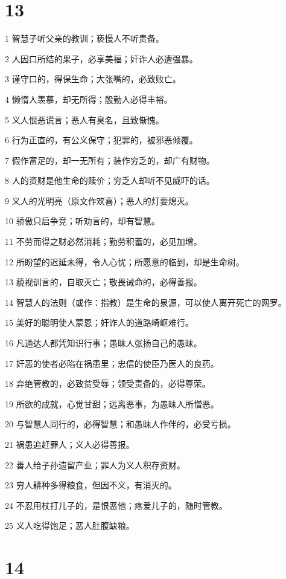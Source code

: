 \chapter{13}

\par 1 智慧子听父亲的教训；亵慢人不听责备。
\par 2 人因口所结的果子，必享美福；奸诈人必遭强暴。
\par 3 谨守口的，得保生命；大张嘴的，必致败亡。
\par 4 懒惰人羡慕，却无所得；殷勤人必得丰裕。
\par 5 义人恨恶谎言；恶人有臭名，且致惭愧。
\par 6 行为正直的，有公义保守；犯罪的，被邪恶倾覆。
\par 7 假作富足的，却一无所有；装作穷乏的，却广有财物。
\par 8 人的资财是他生命的赎价；穷乏人却听不见威吓的话。
\par 9 义人的光明亮（原文作欢喜）；恶人的灯要熄灭。
\par 10 骄傲只启争竞；听劝言的，却有智慧。
\par 11 不劳而得之财必然消耗；勤劳积蓄的，必见加增。
\par 12 所盼望的迟延未得，令人心忧；所愿意的临到，却是生命树。
\par 13 藐视训言的，自取灭亡；敬畏诫命的，必得善报。
\par 14 智慧人的法则（或作：指教）是生命的泉源，可以使人离开死亡的网罗。
\par 15 美好的聪明使人蒙恩；奸诈人的道路崎岖难行。
\par 16 凡通达人都凭知识行事；愚昧人张扬自己的愚昧。
\par 17 奸恶的使者必陷在祸患里；忠信的使臣乃医人的良药。
\par 18 弃绝管教的，必致贫受辱；领受责备的，必得尊荣。
\par 19 所欲的成就，心觉甘甜；远离恶事，为愚昧人所憎恶。
\par 20 与智慧人同行的，必得智慧；和愚昧人作伴的，必受亏损。
\par 21 祸患追赶罪人；义人必得善报。
\par 22 善人给子孙遗留产业；罪人为义人积存资财。
\par 23 穷人耕种多得粮食，但因不义，有消灭的。
\par 24 不忍用杖打儿子的，是恨恶他；疼爱儿子的，随时管教。
\par 25 义人吃得饱足；恶人肚腹缺粮。

\chapter{14}


